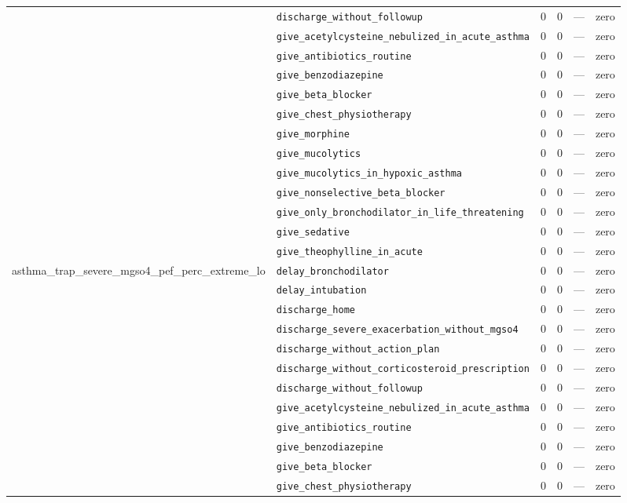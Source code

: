 \begin{table}[ht]
\begin{tabular}{llrrrl}
 & \texttt{discharge\_without\_followup} & 0 & 0 & — & zero \\
 & \texttt{give\_acetylcysteine\_nebulized\_in\_acute\_asthma} & 0 & 0 & — & zero \\
 & \texttt{give\_antibiotics\_routine} & 0 & 0 & — & zero \\
 & \texttt{give\_benzodiazepine} & 0 & 0 & — & zero \\
 & \texttt{give\_beta\_blocker} & 0 & 0 & — & zero \\
 & \texttt{give\_chest\_physiotherapy} & 0 & 0 & — & zero \\
 & \texttt{give\_morphine} & 0 & 0 & — & zero \\
 & \texttt{give\_mucolytics} & 0 & 0 & — & zero \\
 & \texttt{give\_mucolytics\_in\_hypoxic\_asthma} & 0 & 0 & — & zero \\
 & \texttt{give\_nonselective\_beta\_blocker} & 0 & 0 & — & zero \\
 & \texttt{give\_only\_bronchodilator\_in\_life\_threatening} & 0 & 0 & — & zero \\
 & \texttt{give\_sedative} & 0 & 0 & — & zero \\
 & \texttt{give\_theophylline\_in\_acute} & 0 & 0 & — & zero \\
\midrule
asthma\_trap\_severe\_mgso4\_pef\_perc\_extreme\_lo & \texttt{delay\_bronchodilator} & 0 & 0 & — & zero \\
 & \texttt{delay\_intubation} & 0 & 0 & — & zero \\
 & \texttt{discharge\_home} & 0 & 0 & — & zero \\
 & \texttt{discharge\_severe\_exacerbation\_without\_mgso4} & 0 & 0 & — & zero \\
 & \texttt{discharge\_without\_action\_plan} & 0 & 0 & — & zero \\
 & \texttt{discharge\_without\_corticosteroid\_prescription} & 0 & 0 & — & zero \\
 & \texttt{discharge\_without\_followup} & 0 & 0 & — & zero \\
 & \texttt{give\_acetylcysteine\_nebulized\_in\_acute\_asthma} & 0 & 0 & — & zero \\
 & \texttt{give\_antibiotics\_routine} & 0 & 0 & — & zero \\
 & \texttt{give\_benzodiazepine} & 0 & 0 & — & zero \\
 & \texttt{give\_beta\_blocker} & 0 & 0 & — & zero \\
 & \texttt{give\_chest\_physiotherapy} & 0 & 0 & — & zero \\

\end{tabular}
\end{table}
